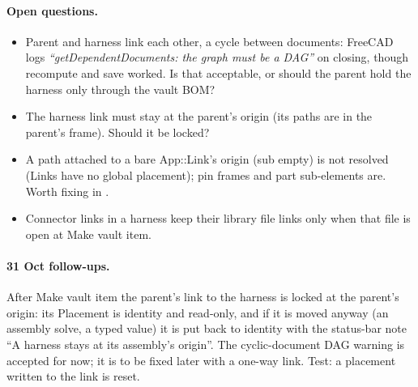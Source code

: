 \paragraph{Open questions.}
\begin{itemize}[nosep]
  \item Parent and harness link each other, a cycle between documents: FreeCAD logs \emph{``getDependentDocuments: the
        graph must be a DAG''} on closing, though recompute and save worked. Is that acceptable, or should the parent
        hold the harness only through the vault BOM?
  \item The harness link must stay at the parent's origin (its paths are in the parent's frame). Should it be locked?
  \item A path attached to a bare App::Link's origin (sub empty) is not resolved (Links have no global placement); pin
        frames and part sub-elements are. Worth fixing in .
  \item Connector links in a harness keep their library file links only when that file is open at Make vault item.
\end{itemize}

\paragraph{31 Oct follow-ups.} After Make vault item the parent's link to the harness is locked at the parent's origin:
its Placement is identity and read-only, and if it is moved anyway (an assembly solve, a typed value) it is put back to
identity with the status-bar note ``A harness stays at its assembly's origin''. The cyclic-document DAG warning is
accepted for now; it is to be fixed later with a one-way link. Test: a placement written to the link is reset.
